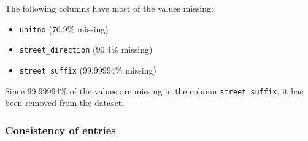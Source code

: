 \documentclass[11pt]{article}
\begin{document}
    \vspace{5mm}

    The following columns have most of the values missing:

    \begin{itemize}
        \item \texttt{unitno} (76.9\% missing)
        \item \texttt{street\_direction} (90.4\% missing)
        \item \texttt{street\_suffix} (99.99994\% missing)
    \end{itemize}

    Since 99.99994\% of the values are missing in the column \texttt{street\_suffix}, it has been removed from the dataset.

    \subsubsection{Consistency of entries} \label{subsubsec:teranet_consistency}
\end{document}
